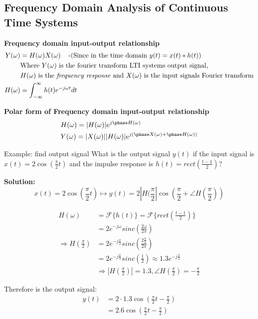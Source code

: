 \subsection{Frequency Domain Analysis of Continuous Time Systems}
\textbf{Frequency domain input-output relationship}
\begin{align*}
    Y(\omega) &= H(\omega)X(\omega) \;\;\; \text{ -(Since in the time domain $y(t)=x(t)*h(t)$)} \\
    &\text{Where $Y(\omega)$ is the fourier transform LTI systems output signal,} \\
    &\text{$H(\omega)$ is the \textit{frequency response} and $X(\omega)$ is the input signals Fourier transform} \\
    H(\omega) &= \int_{-\infty}^{\infty} h(t)e^{-j\omega t} dt
\end{align*}

\noindent\textbf{Polar form of Frequency domain input-output relationship}
\begin{align*}
    &H(\omega) = |H(\omega)|e^{j\phase H(\omega)} \\
    &Y(\omega) = |X(\omega)||H(\omega)|e^{j(\phase X(\omega) + \phase H(\omega))}
\end{align*}

\begin{exampleblock}{Example: find output signal}
    What is the output signal $y(t)$ if the input signal is $x(t)=2\cos(\frac{\pi}{2}t)$ and the
    impulse response is $h(t)=rect(\frac{t-1}{2})$?

    \textbf{Solution:}
    \begin{equation*}
        x(t)=2\cos(\frac{\pi}{2}t) \mapsto y(t)=2|H(\frac{\pi}{2}|\cos(\frac{\pi}{2}+\angle H(\frac{\pi}{2}))
    \end{equation*}

    \begin{align*}
        H(\omega) &= \mathcal{F}\{ h(t) \} = \mathcal{F}\{ rect(\frac{t-1}{2}) \} \\
        &=2e^{-j\omega}sinc(\frac{2\omega}{2\pi}) \\
        \Rightarrow H(\frac{\pi}{2}) &= 2e^{-j\frac{\pi}{2}}sinc(\frac{2\frac{\pi}{2}}{2\pi}) \\
        &= 2e^{-j\frac{\pi}{2}}sinc(\frac{1}{2}) \approx 1.3e^{-j\frac{\pi}{2}} \\
        &\Rightarrow |H(\frac{\pi}{2})|=1.3, \angle H(\frac{\pi}{2}) = -\frac{\pi}{2}
    \end{align*}

    Therefore is the output signal:
    \begin{align*}
        y(t) &= 2\cdot 1.3\cos(\frac{\pi}{2}t-\frac{\pi}{2}) \\
        &= 2.6 \cos(\frac{\pi}{2}t-\frac{\pi}{2})
    \end{align*}
\end{exampleblock}

